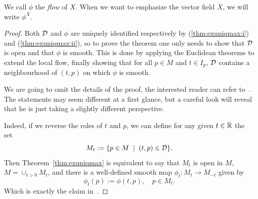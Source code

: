 We call $\phi$ the \emph{flow} of $X$.
When we want to emphasize the vector field $X$, we will write $\phi^X$.

\begin{proof}
	Both $\mathcal{D}$ and $\phi$ are uniquely identified respectively by (\ref{thm:exuniqmax:i}) and (\ref{thm:exuniqmax:ii}), so to prove the theorem one only needs to show that $\mathcal{D}$ is open and that $\phi$ is smooth.
	This is done by applying the Euclidean theorems to extend the local flow, finally showing that for all $p\in M$ and $t\in I_p$, $\mathcal{D}$ contains a neighbourhood of $(t,p)$ on which $\phi$ is smooth.

	We are going to omit the details of the proof, the interested reader can refer to~\cite[Theorem 9.12]{book:lee}.
	The statements may seem different at a first glance, but a careful look will reveal that he is just taking a slightly different perspective.

	Indeed, if we reverse the roles of $t$ and $p$, we can define for any given $t\in \mathbb{R}$ the set
	\begin{equation}
		M_t := \{p\in M \;\mid\; (t,p)\in\mathcal{D}\}.
	\end{equation}
	Then Theorem~\ref{thm:exuniqmax} is equivalent to say that $M_t$ is open in $M$, $M = \cup_{t>0} M_t$, and there is a well-defined smooth map $\phi_t : M_t \to M_{-t}$ given by
	\begin{equation}\label{eq:flowdiffeo}
		\phi_t(p) := \phi(t,p), \quad p\in M_t.
	\end{equation}
	Which is exactly the claim in~\cite[Theorem 9.12]{book:lee}.





\end{proof}
